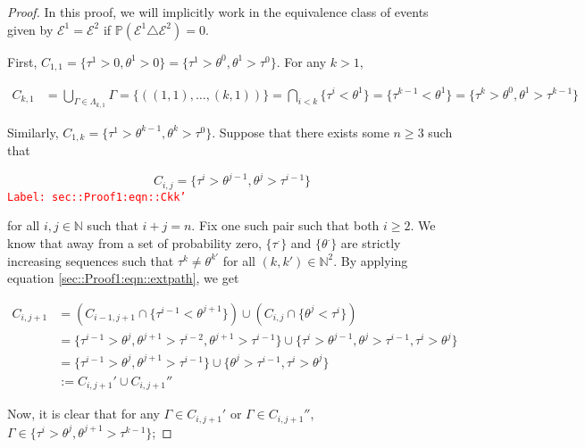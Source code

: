 \documentclass[12pt]{article}
\newcommand{\mb}{\mathbb}
\newcommand{\mc}{\mathcal}
\newcommand{\tr}{\textcolor{red}}
\newcommand{\labe}[1]{\tr{\texttt{Label: #1}}}
\newcommand{\ind}{\hspace{24pt}}
\newcommand{\pr}{\mb{P}}							%
\newcommand{\rt}[1]{\tau^{#1}}						%
\newcommand{\rtt}[1]{\theta^{#1}}					%
\renewcommand{\it}{k}								%
\newcommand{\itt}{i}								%
\newcommand{\ittt}{j}								%
\newcommand{\apath}{\Gamma}						%
\newcommand{\pathset}[2]{\Lambda_{#1,#2}}			%
\newcommand{\pathsete}[2]{C_{#1,#2}}			%
\newcommand{\evnt}{\mc{E}}						%
\begin{document}
\begin{proof}
In this proof, we will implicitly work in the equivalence class of events given by \(\evnt^1 = \evnt^2\) if \(\pr(\evnt^1 \triangle \evnt^2) = 0\).  

\ind First, \(\pathsete{1}{1} = \{\rt{1} > 0,\rtt{1} > 0\} = \{\rt{1} > \rtt{0},\rtt{1}>\rt{0}\}\). For any \(\it > 1\),

\begin{align*}
\pathsete{\it}{1} &= \bigcup_{\apath \in \pathset{\it}{1}} \apath = \{((1,1),\dots,(\it,1))\} = \bigcap_{\itt < \it} \{\rt{\itt} < \rtt{1}\} = \{\rt{\it-1} < \rtt{1}\} = \{\rt{\it} > \rtt{0},\rtt{1} > \rt{\it-1}\}
\end{align*}

Similarly, \(\pathsete{1}{\it} = \{\rt{1} > \rtt{\it-1}, \rtt{\it} > \rt{0}\}\). Suppose that there exists some \(n\geq 3\) such that

\begin{equation}
\pathsete{\itt}{\ittt} = \{\rt{\itt} > \rtt{\ittt-1},\rtt{\ittt} > \rt{\itt-1}\}
\label{sec::Proof1:eqn::Ckk'}
\end{equation}
\labe{sec::Proof1:eqn::Ckk'}

for all \(\itt, \ittt\in \mb{N}\) such that \(\itt+\ittt = n\). Fix one such pair such that both \(\itt \geq 2\). We know that away from a set of probability zero, \(\{\rt{\cdot}\}\) and \(\{\rtt{\cdot}\}\) are strictly increasing sequences such that \(\rt{\it} \neq \rtt{\it'}\) for all \((\it,\it')\in \mb{N}^2\). By applying equation \eqref{sec::Proof1:eqn::extpath}, we get

\begin{align*}
\pathsete{\itt}{\ittt+1} &= \left(\pathsete{\itt-1}{\ittt+1} \cap \{\rt{\itt - 1} < \rtt{\ittt+1}\}\right) \cup \left(\pathsete{\itt}{\ittt}\cap \{\rtt{\ittt} < \rt{\itt}\}\right)\\
&= \{\rt{\itt - 1} > \rtt{\ittt}, \rtt{\ittt+1} > \rt{\itt - 2},  \rtt{\ittt+1} > \rt{\itt -1}\}\cup\{\rt{\itt} > \rtt{\ittt-1}, \rtt{\ittt} > \rt{\itt - 1},\rt{\itt} > \rtt{\ittt}\}\\
&= \{\rt{\itt - 1} > \rtt{\ittt}, \rtt{\ittt+1} > \rt{\itt - 1}\}\cup\{\rtt{\ittt} > \rt{\itt - 1},\rt{\itt} > \rtt{\ittt}\}\\
&:= \pathsete{\itt}{\ittt+1}' \cup\pathsete{\itt}{\ittt+1}''
\end{align*}

Now, it is clear that for any \(\apath \in \pathsete{\itt}{\ittt+1}'\) or \(\apath \in \pathsete{\itt}{\ittt+1}''\), \(\apath\in \{\rt{\itt} > \rtt{\ittt},\rtt{\ittt+1} > \rt{\it-1}\}\);


\end{proof}
\end{document}

